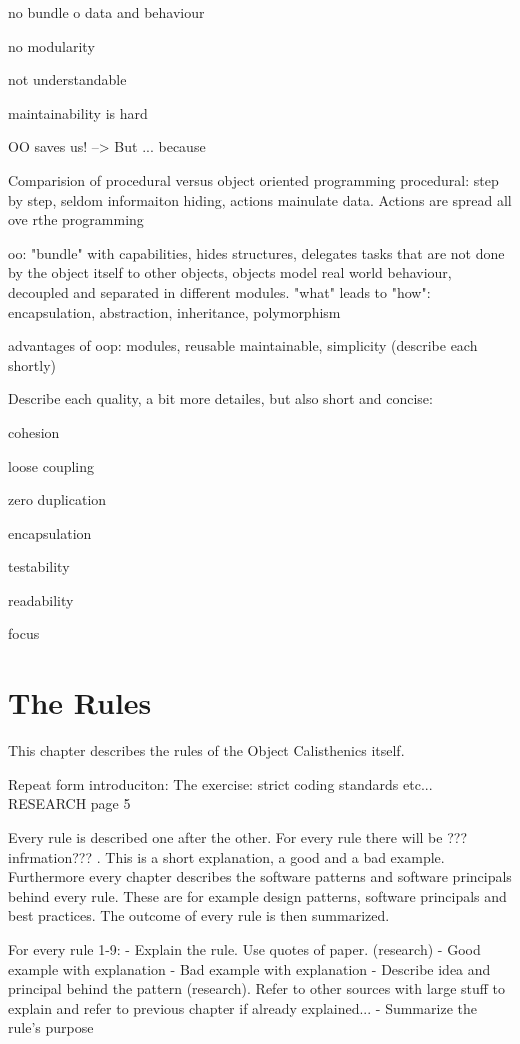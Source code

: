 no bundle o data and behaviour

no modularity

not understandable

maintainability is hard

OO saves us! --> But ... because

Comparision of procedural versus object oriented programming
procedural: step by step, seldom informaiton hiding, actions mainulate data. Actions are spread all ove rthe programming

oo: "bundle" with capabilities, hides structures, delegates tasks that are not done by the object itself to other objects, objects model real world behaviour, decoupled and separated in different modules. "what" leads to "how": encapsulation, abstraction, inheritance, polymorphism

advantages of oop: modules, reusable maintainable, simplicity (describe each shortly) 

Describe each quality, a bit more detailes, but also short and concise: 

cohesion

loose coupling

zero duplication

encapsulation

testability

readability

focus

\section{The Rules}
This chapter describes the rules of the Object Calisthenics itself. 

Repeat form introduciton:
The exercise: strict coding standards etc... RESEARCH page 5

Every rule is described one after the other. For every rule there will be ??? infrmation??? . This is a short explanation, a good and a bad example. Furthermore every chapter describes the software patterns and software principals behind every rule. These are for example design patterns, software principals and best practices. The outcome of every rule is then summarized.

For every rule 1-9: 
 - Explain the rule. Use quotes of paper. (research)
 - Good example with explanation
 - Bad example with explanation
 - Describe idea and principal behind the pattern (research). Refer to other sources with large stuff to explain and refer to previous chapter if already explained...
 - Summarize the rule's purpose

